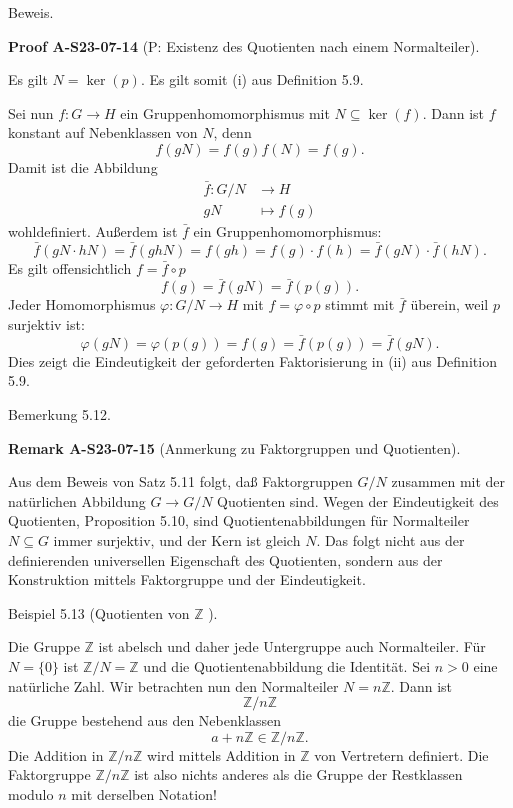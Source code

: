 \documentclass[10pt, letterpaper]{article}
\newcommand{\CustomHeading}[3]{%
  \par\medskip\noindent%
  \textbf{#1 #2} \textnormal{(#3)}.\enskip%
}
\newenvironment{REM}[2]{\begin{unitbox}\CustomHeading{Remark}{#1}{#2}}{\end{unitbox}}
\newenvironment{PROOF}[2]{\begin{unitbox}\CustomHeading{Proof}{#1}{#2}}{\end{unitbox}}
\begin{document}
Beweis. 

\begin{PROOF}{A-S23-07-14}{P: Existenz des Quotienten nach einem Normalteiler}
Es gilt $N=\operatorname{ker}(p)$. Es gilt somit (i) aus Definition 5.9.

Sei nun $f: G \rightarrow H$ ein Gruppenhomomorphismus mit $N \subseteq \operatorname{ker}(f)$. Dann ist $f$ konstant auf Nebenklassen von $N$, denn
$$
f(g N)=f(g) f(N)=f(g) .
$$
Damit ist die Abbildung
$$
\begin{aligned}
\bar{f}: G / N & \rightarrow H \\
g N & \mapsto f(g)
\end{aligned}
$$
wohldefiniert. Außerdem ist $\bar{f}$ ein Gruppenhomomorphismus:
$$
\bar{f}(g N \cdot h N)=\bar{f}(g h N)=f(g h)=f(g) \cdot f(h)=\bar{f}(g N) \cdot \bar{f}(h N) .
$$
Es gilt offensichtlich $f=\bar{f} \circ p$
$$
f(g)=\bar{f}(g N)=\bar{f}(p(g)) .
$$
Jeder Homomorphismus $\varphi: G / N \rightarrow H$ mit $f=\varphi \circ p$ stimmt mit $\bar{f}$ überein, weil $p$ surjektiv ist:
$$
\varphi(g N)=\varphi(p(g))=f(g)=\bar{f}(p(g))=\bar{f}(g N) .
$$
Dies zeigt die Eindeutigkeit der geforderten Faktorisierung in (ii) aus Definition 5.9.
\end{PROOF}


Bemerkung 5.12. 

\begin{REM}{A-S23-07-15}{Anmerkung zu Faktorgruppen und Quotienten}
Aus dem Beweis von Satz 5.11 folgt, daß Faktorgruppen $G / N$ zusammen mit der natürlichen Abbildung $G \rightarrow G / N$ Quotienten sind. Wegen der Eindeutigkeit des Quotienten, Proposition 5.10, sind Quotientenabbildungen für Normalteiler $N \subseteq G$ immer surjektiv, und der Kern ist gleich $N$. Das folgt nicht aus der definierenden universellen Eigenschaft des Quotienten, sondern aus der Konstruktion mittels Faktorgruppe und der Eindeutigkeit.
\end{REM}

Beispiel 5.13 (Quotienten von $\mathbb{Z}$ ). 

Die Gruppe $\mathbb{Z}$ ist abelsch und daher jede Untergruppe auch Normalteiler. Für $N=\{0\}$ ist $\mathbb{Z} / N=\mathbb{Z}$ und die Quotientenabbildung die Identität. Sei $n>0$ eine natürliche Zahl. Wir betrachten nun den Normalteiler $N=n \mathbb{Z}$. Dann ist
$$
\mathbb{Z} / n \mathbb{Z}
$$
die Gruppe bestehend aus den Nebenklassen
$$
a+n \mathbb{Z} \in \mathbb{Z} / n \mathbb{Z} .
$$
Die Addition in $\mathbb{Z} / n \mathbb{Z}$ wird mittels Addition in $\mathbb{Z}$ von Vertretern definiert. Die Faktorgruppe $\mathbb{Z} / n \mathbb{Z}$ ist also nichts anderes als die Gruppe der Restklassen modulo $n$ mit derselben Notation!
\end{document}
